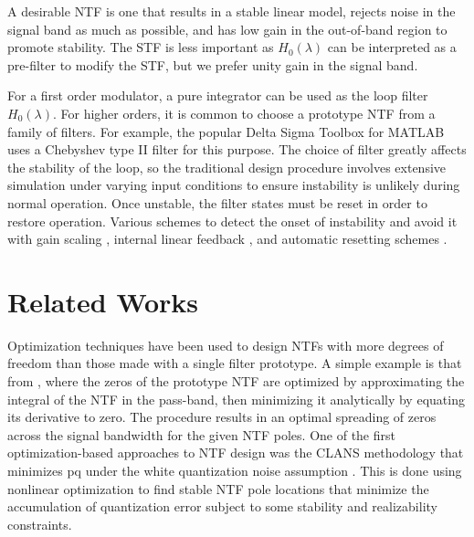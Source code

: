 A desirable \gls{NTF} is one that results in a stable linear model, rejects noise in the signal band as much as possible, and has low gain in the out-of-band region to promote stability. The \gls{STF} is less important as $H_0(\lambda)$ can be interpreted as a pre-filter to modify the \gls{STF}, but we prefer unity gain in the signal band.

For a first order modulator, a pure integrator can be used as the loop filter $H_0(\lambda)$. For higher orders, it is common to choose a prototype \gls{NTF} from a family of filters. For example, the popular Delta Sigma Toolbox for MATLAB \cite[Appx. B]{Schreier1997} uses a Chebyshev type II filter for this purpose. The choice of filter greatly affects the stability of the loop, so the traditional design procedure involves extensive simulation under varying input conditions to ensure instability is unlikely during normal operation. Once unstable, the filter states must be reset in order to restore operation. Various schemes to detect the onset of instability \cite{Wong2004} and avoid it with gain scaling \cite{Sooch1989}, internal linear feedback \cite{Moussavi1994}, and automatic resetting schemes \cite{Eynde1991}.

\section{Related Works}
\label{sec:in-rw}

Optimization techniques have been used to design \gls{NTF}s with more degrees of freedom than those made with a single filter prototype. A simple example is that from \cite[Sec. 4.3]{Schreier1997}, where the zeros of the prototype \gls{NTF} are optimized by approximating the integral of the \gls{NTF} in the pass-band, then minimizing it analytically by equating its derivative to zero. The procedure results in an optimal spreading of zeros across the signal bandwidth for the given \gls{NTF} poles. One of the first optimization-based approaches to \gls{NTF} design was the \gls{CLANS} methodology that minimizes \gls{pq} under the white quantization noise assumption \cite{Kenney1988}. This is done using nonlinear optimization to find stable \gls{NTF} pole locations that minimize the accumulation of quantization error subject to some stability and realizability constraints.

